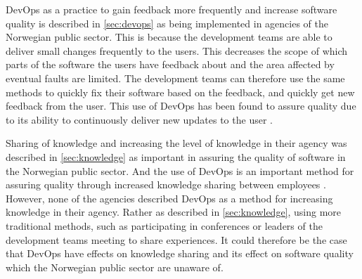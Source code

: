DevOps as a practice to gain feedback more frequently and increase software quality is described in \autoref{sec:devops} as being implemented in agencies of the Norwegian public sector. This is because the development teams are able to deliver small changes frequently to the users. This decreases the scope of which parts of the software the users have feedback about and the area affected by eventual faults are limited. The development teams can therefore use the same methods to quickly fix their software based on the feedback, and quickly get new feedback from the user. This use of DevOps has been found to assure quality due to its ability to continuously deliver new updates to the user \cite{am_2020}\cite{smm_2018}\cite{ml_2022}.


Sharing of knowledge and increasing the level of knowledge in their agency was described in \autoref{sec:knowledge} as important in assuring the quality of software in the Norwegian public sector. And the use of DevOps is an important method for assuring quality through increased knowledge sharing between employees \cite{smm_2018}\cite{mm_2021}. However, none of the agencies described DevOps as a method for increasing knowledge in their agency. Rather as described in \autoref{sec:knowledge}, using more traditional methods, such as participating in conferences or leaders of the development teams meeting to share experiences. It could therefore be the case that DevOps have effects on knowledge sharing and its effect on software quality which the Norwegian public sector are unaware of.


